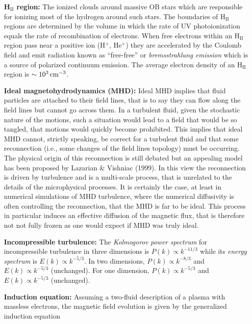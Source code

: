 \documentclass[a4paper,10pt]{article}
\begin{document}
{\noindent}\textbf{H$_\mathrm{II}$ region:} The ionized clouds around massive OB stars which are responsible for ionizing most of the hydrogen around such stars. The boundaries of H$_\mathrm{II}$ regions are determined by the volume in which the rate of UV photoionization equals the rate of recombination of electrons. When free electrons within an H$_\mathrm{II}$ region pass near a positive ion (H$^+$, He$^+$) they are accelerated by the Coulomb field and emit radiation known as ``free-free'' or \textit{bremsstrahlung emission} which is a source of polarized continuum emission. The average electron density of an H$_\mathrm{II}$ region is $\sim10^3\,{\rm cm^{-3}}$.

{\noindent}\textbf{Ideal magnetohydrodynamics (MHD):} Ideal MHD implies that fluid particles are attached to their field lines, that is to say they can flow along the field lines but cannot go across them. In a turbulent fluid, given the stochastic nature of the motions, such a situation would lead to a field that would be so tangled, that motions would quickly become prohibited. This implies that ideal MHD cannot, strictly speaking, be correct for a turbulent fluid and that some reconnection (i.e., some changes of the field lines topology) must be occurring. The physical origin of this reconnection is still debated but an appealing model has been proposed by Lazarian \& Vishniac (1999). In this view the reconnection is driven by turbulence and is a multi-scale process, that is unrelated to the details of the microphysical processes. It is certainly the case, at least in numerical simulations of MHD turbulence, where the numerical diffusivity is often controlling the reconnection, that the MHD is far to be ideal. This process in particular induces an effective diffusion of the magnetic flux, that is therefore not not fully frozen as one would expect if MHD was truly ideal.

{\noindent}\textbf{Incompressible turbulence:} The \textit{Kolmogorov power spectrum} for incompressible turbulence in three dimensions is $P(k)\propto k^{-11/3}$ while its \textit{energy spectrum} is $E(k)\propto k^{-5/3}$. In two dimensions, $P(k)\propto k^{-8/3}$ and $E(k)\propto k^{-5/3}$ (unchanged). For one dimension, $P(k)\propto k^{-5/3}$ and $E(k)\propto k^{-5/3}$ (unchanged).

{\noindent}\textbf{Induction equation:} Assuming a two-fluid description of a plasma with massless electrons, the magnetic field evolution is given by the generalized induction equation
\end{document}
